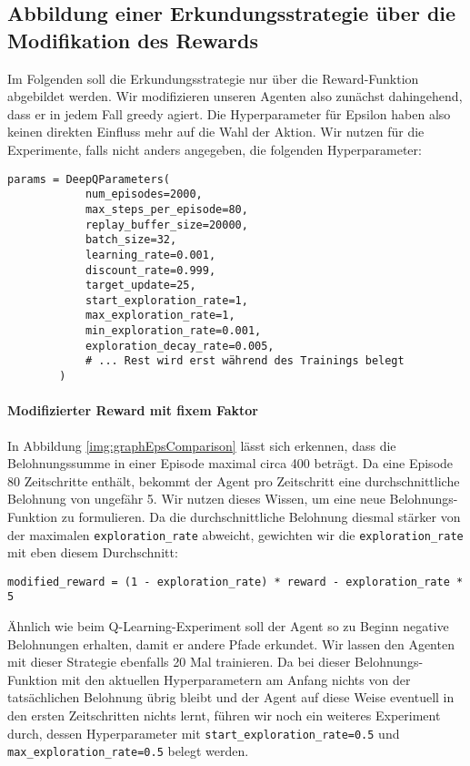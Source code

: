 \subsection{Abbildung einer Erkundungsstrategie über die Modifikation des Rewards} \label{sec:deepQRewardModification}
Im Folgenden soll die Erkundungsstrategie nur über die Reward-Funktion abgebildet werden. Wir modifizieren unseren Agenten also zunächst dahingehend, dass er in jedem Fall greedy agiert. Die Hyperparameter für Epsilon haben also keinen direkten Einfluss mehr auf die Wahl der Aktion. Wir nutzen für die Experimente, falls nicht anders angegeben, die folgenden Hyperparameter:
\begin{verbatim}
params = DeepQParameters(
            num_episodes=2000,
            max_steps_per_episode=80,
            replay_buffer_size=20000,
            batch_size=32,
            learning_rate=0.001,
            discount_rate=0.999,
            target_update=25,
            start_exploration_rate=1,
            max_exploration_rate=1,
            min_exploration_rate=0.001,
            exploration_decay_rate=0.005,
            # ... Rest wird erst während des Trainings belegt
        )
\end{verbatim}

\paragraph{Modifizierter Reward mit fixem Faktor}
In Abbildung \ref{img:graphEpsComparison} lässt sich erkennen, dass die Belohnungssumme in einer Episode maximal circa 400 beträgt. Da eine Episode 80 Zeitschritte enthält, bekommt der Agent pro Zeitschritt eine durchschnittliche Belohnung von ungefähr 5. Wir nutzen dieses Wissen, um eine neue Belohnungs-Funktion zu formulieren. Da die durchschnittliche Belohnung diesmal stärker von der maximalen \texttt{exploration_rate} abweicht, gewichten wir die \texttt{exploration_rate} mit eben diesem Durchschnitt:
\begin{verbatim}
modified_reward = (1 - exploration_rate) * reward - exploration_rate * 5
\end{verbatim}
Ähnlich wie beim Q-Learning-Experiment soll der Agent so zu Beginn negative Belohnungen erhalten, damit er andere Pfade erkundet. Wir lassen den Agenten mit dieser Strategie ebenfalls 20 Mal trainieren. Da bei dieser Belohnungs-Funktion mit den aktuellen Hyperparametern am Anfang nichts von der tatsächlichen Belohnung übrig bleibt und der Agent auf diese Weise eventuell in den ersten Zeitschritten nichts lernt, führen wir noch ein weiteres Experiment durch, dessen Hyperparameter mit \texttt{start_exploration_rate=0.5} und \texttt{max_exploration_rate=0.5} belegt werden.

